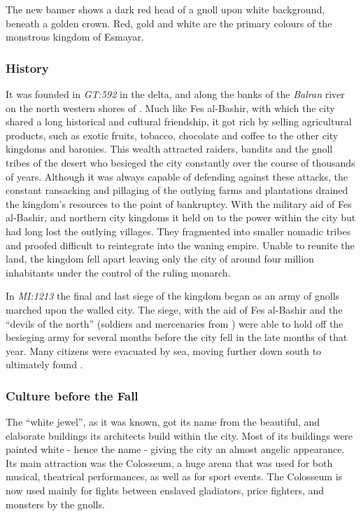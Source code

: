 The new banner shows a dark red head of a gnoll upon white background, beneath
a golden crown. Red, gold and white are the primary colours of the monstrous
kingdom of Esmayar.

\subsubsection{History}

It was founded in \emph{GT:592} in the delta, and along the banks of the
\emph{Balran} river on the north western shores of . Much
like Fes al-Bashir, with which the city shared a long historical and cultural
friendship, it got rich by selling agricultural products, such as exotic
fruits, tobacco, chocolate and coffee to the other city kingdoms and
baronies. This wealth attracted raiders, bandits and the gnoll tribes of the
desert who besieged the city constantly over the course of thousands of
years. Although it was always capable of defending against these attacks, the
constant ransacking and pillaging of the outlying farms and plantations
drained the kingdom's resources to the point of bankruptcy. With the military
aid of Fes al-Bashir, and northern city kingdoms it held on to the power within
the city but had long lost the outlying villages. They fragmented into smaller
nomadic tribes and proofed difficult to reintegrate into the waning
empire. Unable to reunite the land, the kingdom fell apart leaving only the
city of around four million inhabitants under the control of the ruling
monarch.

In \emph{MI:1213} the final and last siege of the kingdom began as an army of
gnolls marched upon the walled city. The siege, with the aid of Fes al-Bashir
and the ``devils of the north'' (soldiers and mercenaries from
) were able to hold off the besieging army for several
months before the city fell in the late months of that year. Many citizens
were evacuated by sea, moving further down south to ultimately found
.

\subsubsection{Culture before the Fall}

The ``white jewel'', as it was known, got its name from the beautiful, and
elaborate buildings its architects build within the city. Most of its
buildings were painted white - hence the name - giving the city an almost
angelic appearance. Its main attraction was the Colosseum, a huge arena
that was used for both musical, theatrical performances, as well as for
sport events. The Colosseum is now used mainly for fights between enslaved
gladiators, price fighters, and monsters by the gnolls.

